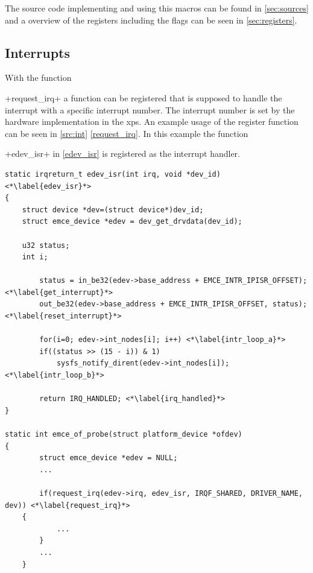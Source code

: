 \documentclass[12pt,a4paper,parskip=full,abstract=true,BCOR=12mm,twoside,open=right]{scrreprt}
\newcommand{\hack}{}
\newcommand*{\SavedLstInline}{}
\DeclareRobustCommand*{\lstinline}{%
  \ifmmode
    \let\SavedBGroup\bgroup
    \def\bgroup{%
      \let\bgroup\SavedBGroup
      \hbox\bgroup
    }%
  \fi
  \SavedLstInline
}
\begin{document}
The source code implementing and using this macros can be found in
\cref{sec:sources} and a overview of the registers including the flags can be
seen in \cref{sec:registers}.


\subsection{Interrupts}
\label{sec:interrupts}

With the function \lstinline+request_irq+ a function can be registered that
is supposed to handle the interrupt with a specific interrupt number\cite{ldd}. The
interrupt number is set by the hardware implementation in the \gls{xps}.
An example usage of the register function can be seen in \cref{src:int}
\cref{request_irq}. In this example the function \lstinline+edev_isr+
in \cref{edev_isr} is registered as the interrupt handler.

\begin{lstlisting}[float=htb,caption={Driver interrupt routine},label=src:int,basicstyle=\hack\scriptsize]
static irqreturn_t edev_isr(int irq, void *dev_id) <*\label{edev_isr}*>
{
	struct device *dev=(struct device*)dev_id;
	struct emce_device *edev = dev_get_drvdata(dev_id);

	u32 status;
	int i;

        status = in_be32(edev->base_address + EMCE_INTR_IPISR_OFFSET); <*\label{get_interrupt}*>
        out_be32(edev->base_address + EMCE_INTR_IPISR_OFFSET, status); <*\label{reset_interrupt}*>

        for(i=0; edev->int_nodes[i]; i++) <*\label{intr_loop_a}*>
		if((status >> (15 - i)) & 1)
			sysfs_notify_dirent(edev->int_nodes[i]); <*\label{intr_loop_b}*>

        return IRQ_HANDLED; <*\label{irq_handled}*>
}

static int emce_of_probe(struct platform_device *ofdev)
{
        struct emce_device *edev = NULL;
        ...

        if(request_irq(edev->irq, edev_isr, IRQF_SHARED, DRIVER_NAME, dev)) <*\label{request_irq}*>
	{
            ...
        }
        ...
    }
\end{lstlisting}
\end{document}
